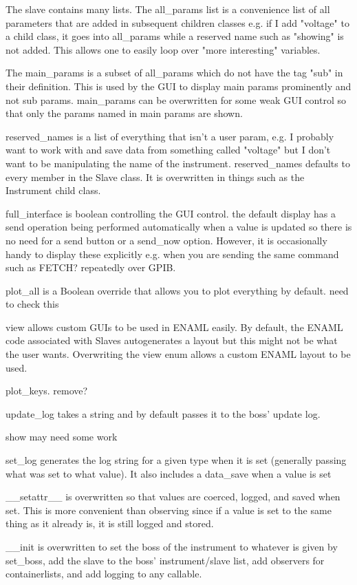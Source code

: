 \documentclass[12pt,a4paper]{article}
\begin{document}
The slave contains many lists. The all\_params list is a convenience list of all parameters that are added in subsequent children classes e.g. if I add "voltage" to a child class, it goes into all\_params while a reserved name such as "showing" is not added. This allows one to easily loop over "more interesting" variables. 

The main\_params is a subset of all\_params which do not have the tag "sub" in their definition. This is used by the GUI to display main params prominently and not sub params. main\_params can be overwritten for some weak GUI control so that only the params named in main params are shown.

reserved\_names is a list of everything that isn't a user param, e.g. I probably want to work with and save data from something called "voltage" but I don't want to be manipulating the name of the instrument. reserved\_names defaults to every member in the Slave class. It is overwritten in things such as the Instrument child class.

full\_interface is boolean controlling the GUI control. the default display has a send operation being performed automatically when a value is updated so there is no need for a send button or a send\_now option. However, it is occasionally handy to display these explicitly e.g. when you are sending the same command such as FETCH? repeatedly over GPIB. 

plot\_all is a Boolean override that allows you to plot everything by default. need to check this

view allows custom GUIs to be used in ENAML easily. By default, the ENAML code associated with Slaves autogenerates a layout but this might not be what the user wants. Overwriting the view enum allows a custom ENAML layout to be used.

plot\_keys. remove?

update\_log takes a string and by default passes it to the boss' update log.

show may need some work

set\_log generates the log string for a given type when it is set (generally passing what was set to what value). It also includes a data\_save when a value is set

\_\_setattr\_\_ is overwritten so that values are coerced, logged, and saved when set. This is more convenient than observing since if a value is set to the same thing as it already is, it is still logged and stored.

{\_\_init} is overwritten to set the boss of the instrument to whatever is given by set\_boss, add the slave to the boss' instrument/slave list, add observers for containerlists, and add logging to any callable.
\end{document}
